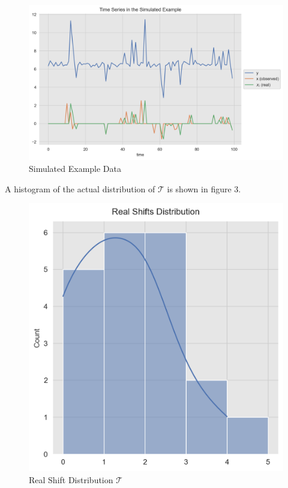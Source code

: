 \documentclass[11pt]{amsart}
\begin{document}
\begin{center}
\begin{figure}
\includegraphics[totalheight=6cm]{images/simulated_example.png}
\caption{Simulated Example Data}
\label{fig:verticalcell}
\end{figure}
\end{center}

A histogram of the actual distribution of $\mathcal{T}$ is shown in figure 3.

\begin{center}
\begin{figure}
\includegraphics[totalheight=6cm]{images/real_shifts.png}
\caption{Real Shift Distribution $\mathcal{T}$}
\label{fig:verticalcell}
\end{figure}
\end{center}
\end{document}

